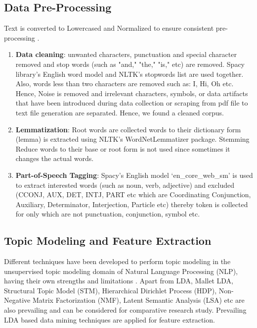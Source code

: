 \documentclass[sn-mathphys,Numbered]{sn-jnl}%
\theoremstyle{thmstyleone}%
\theoremstyle{thmstyletwo}%
\theoremstyle{thmstylethree}%
\begin{document}
\subsection{Data Pre-Processing}\label{data_pre}
Text is converted to Lowercased and Normalized to ensure consistent pre-processing \cite{kao_natural_2007}.
  \begin{enumerate}[label=(\roman*)]
  \item
    \textbf{Data cleaning}: unwanted characters, punctuation and special
    character removed and stop words (such as "and," "the," "is," etc)
    are removed. Spacy library's English word model and NLTK's stopwords
    list are used together. Also, words less than two characters are
    removed such as: I, Hi, Oh etc. Hence, Noise is removed and
    irrelevant characters, symbols, or data artifacts that have been
    introduced during data collection or scraping from pdf file to text
    file generation are separated. Hence, we found a cleaned corpus.
  \item
    \textbf{Lemmatization}: Root words are collected words to their dictionary
    form (lemma) is extracted using NLTK's WordNetLemmatizer package.
    Stemming Reduce words to their base or root form is not used since
    sometimes it changes the actual words.
  \item
    \textbf{Part-of-Speech Tagging}: Spacy's English model `en\_core\_web\_sm' is
    used to extract interested words (such as noun, verb, adjective) and
    excluded (CCONJ, AUX, DET, INTJ, PART etc which are Coordinating
    Conjunction, Auxiliary, Determinator, Interjection, Particle etc)
    thereby token is collected for only which are not punctuation,
    conjunction, symbol etc.
  \end{enumerate}

\subsection{Topic Modeling and Feature Extraction}\label{top_mod_feature}
Different techniques have been developed to perform topic modeling in the unsupervised topic modeling domain of Natural Language Processing (NLP), having their own strengths and limitations \cite{vayansky2020review, abdelrazek2022topic, yi2009comparative}. Apart from LDA, Mallet LDA, Structural Topic Model (STM), Hierarchical Dirichlet Process (HDP), Non-Negative Matrix Factorization (NMF), Latent Semantic Analysis (LSA) etc are also prevailing and can be considered for comparative research study. Prevailing LDA based data mining techniques are applied for feature extraction. 
\end{document}
